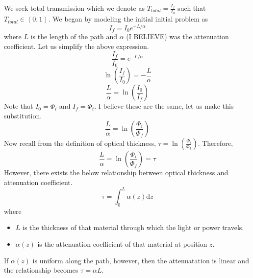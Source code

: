 \documentclass[12pt]{scrartcl}
\begin{document}
We seek total transmission which we denote as $T_{total} = \frac{I_f}{I_0}$ such that $T_{total} \in (0, 1)$. We began by modeling the initial initial problem as 
\[I_f = I_0e^{-L/\alpha}\]
where $L$ is the length of the path and $\alpha$ (I BELIEVE) was the attenuation coefficient. Let us simplify the above expression.
\[\frac{I_f}{I_0} = e^{-L/\alpha}\]
\[\ln(\frac{I_f}{I_0}) = -\frac{L}{\alpha}\]
\[\frac{L}{\alpha} = \ln(\frac{I_0}{I_f})\]
Note that $I_0 = \Phi_i$ and $I_f = \Phi_t$. I believe these are the same, let us make this substitution.
\[\frac{L}{\alpha} = \ln(\frac{\Phi_i}{\Phi_f})\]
Now recall from the definition of optical thickness, $\tau = \ln(\frac{\Phi_i}{\Phi_f})$. Therefore, 
\[\frac{L}{\alpha} = \ln(\frac{\Phi_i}{\Phi_f}) = \tau\]
However, there exists the below relationship between optical thickness and attenuation coefficient.
\[\tau = \int_0^L\alpha(z) \text{d}z\]
where 
\begin{itemize}
    \item $L$ is the thickness of that material through which the light or power travels.
    \item $\alpha(z)$ is the attenuation coefficient of that material at position $z$.
\end{itemize}
If $\alpha(z)$ is uniform along the path, however, then the attenuatation is linear and the relationship becomes $\tau = \alpha L$.
\end{document}
